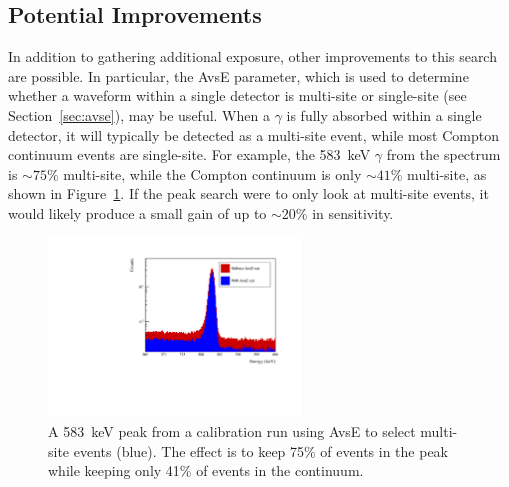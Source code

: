 \documentclass[/main.tex]{subfiles}
\begin{document}
\subsection{Potential Improvements}
In addition to gathering additional exposure, other improvements to this search are possible.
In particular, the AvsE parameter, which is used to determine whether a waveform within a single detector is multi-site or single-site (see Section~\ref{sec:avse}), may be useful.
When a $\gamma$ is fully absorbed within a single detector, it will typically be detected as a multi-site event, while most Compton continuum events are single-site.
For example, the 583~keV $\gamma$ from the  spectrum is ${\sim}75\%$ multi-site, while the Compton continuum is only ${\sim}41\%$ multi-site, as shown in Figure~\ref{fig:avse583}.
If the peak search were to only look at multi-site events, it would likely produce a small gain of up to ${\sim}20\%$ in sensitivity.
\begin{figure}[tb]
  \centering
  \includegraphics[width=0.6\textwidth]{avse583}
  \caption[583~keV peak with AvsE cut applied]{\label{fig:avse583}
    A 583~keV peak from a  calibration run using AvsE to select multi-site events (blue). The effect is to keep 75\% of events in the peak while keeping only 41\% of events in the continuum.
  }
\end{figure}
\end{document}
